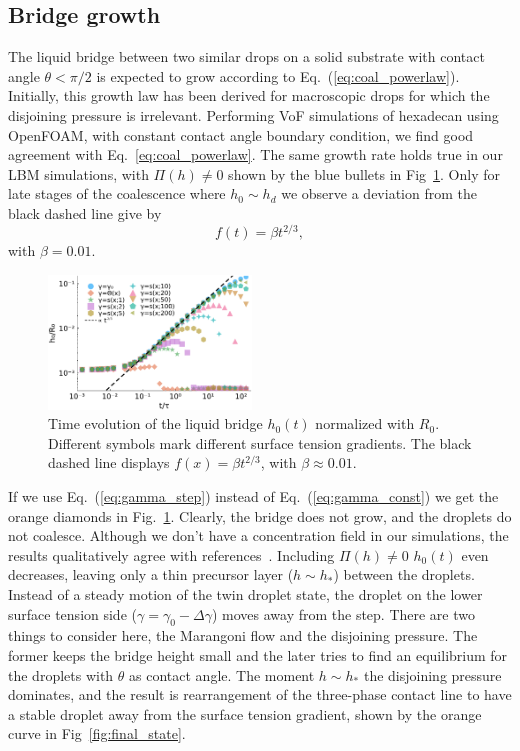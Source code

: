 \documentclass[twocolumn,amsmath,amssymb,showpacs,pre,nofootinbib,superscriptaddress]{revtex4-1} %
\begin{document}
\subsection{Bridge growth}\label{subsec:growth}
The liquid bridge between two similar drops on a solid substrate with contact angle $\theta < \pi/2$ is expected to grow according to Eq.~(\ref{eq:coal_powerlaw}). 
Initially, this growth law has been derived for macroscopic drops for which the disjoining pressure is irrelevant.
Performing VoF simulations of hexadecan using OpenFOAM, with constant contact angle boundary condition, we find good agreement with Eq.~\ref{eq:coal_powerlaw}.
The same growth rate holds true in our LBM simulations, with $\Pi(h) \neq 0$ shown by the blue bullets in Fig~\ref{fig:bridge_growth}.
Only for late stages of the coalescence where $h_0 \sim h_d$ we observe a deviation from the black dashed line give by
\begin{equation}\label{eq:fit_powerlaw}
    f(t) = \beta t^{2/3},
\end{equation}
with $\beta = 0.01$.
\begin{figure}
    \centering
    \includegraphics[width=0.48\textwidth]{Figures/bridge_evo_all_2.pdf}
    \caption{Time evolution of the liquid bridge $h_0(t)$ normalized with $R_0$. 
    Different symbols mark different surface tension gradients.
    The black dashed line displays $f(x) = \beta t^{2/3}$, with $\beta \approx 0.01$.}
    \label{fig:bridge_growth}
\end{figure} 

If we use Eq.~(\ref{eq:gamma_step}) instead of Eq.~(\ref{eq:gamma_const}) we get the orange diamonds in Fig.~\ref{fig:bridge_growth}.
Clearly, the bridge does not grow, and the droplets do not coalesce.
Although we don't have a concentration field in our simulations, the results qualitatively agree with references~\cite{karpitschka2014sharp, doi:10.1021/la500459v, PhysRevLett.109.066103, doi:10.1021/la800630w}. 
Including $\Pi(h) \neq 0$ $h_0(t)$ even decreases, leaving only a thin precursor layer ($h\sim h_{\ast}$) between the droplets.
Instead of a steady motion of the twin droplet state, the droplet on the lower surface tension side ($\gamma = \gamma_0 - \Delta\gamma$) moves away from the step.
There are two things to consider here, the Marangoni flow and the disjoining pressure.
The former keeps the bridge height small and the later tries to find an equilibrium for the droplets with $\theta$ as contact angle.
The moment $h\sim h_{\ast}$ the disjoining pressure dominates, and the result is rearrangement of the three-phase contact line to have a stable droplet away from the surface tension gradient, shown by the orange curve in Fig~\ref{fig:final_state}.
\end{document}

